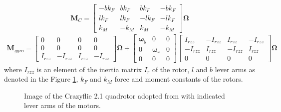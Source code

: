 \documentclass[11pt, a4paper, twoside]{report}
\begin{document}
\begin{equation}
	\bm{M}_C = 	
	\begin{bmatrix}
		-bk_F & bk_F & bk_F & -bk_F \\
		lk_F & lk_F & -lk_F & -lk_F \\
		k_M & -k_M & k_M & -k_M 
	\end{bmatrix} \bm{\Omega}
	\label{eq:m_c}
\end{equation}
\begin{equation}
	\begin{split}
	\bm{M}_{gyro} = 
	\begin{bmatrix}
		0 & 0 & 0 & 0 \\
		0 & 0 & 0 & 0 \\
		I_{rzz} & -I_{rzz} & I_{rzz} & -I_{rzz}
	\end{bmatrix} \bm{\dot{\Omega}}	+
	\begin{bmatrix}
		\bm{\omega}_y & 0 & 0 \\
		0 & \bm{\omega}_x & 0 \\
		0 & 0 & 0 
	\end{bmatrix}	
	\begin{bmatrix}
		I_{rzz} & -I_{rzz} & I_{rzz} & -I_{rzz} \\
		-I_{rzz} & I_{rzz} & -I_{rzz} & I_{rzz} \\
		0 & 0 & 0 & 0 
	\end{bmatrix} \bm{\Omega}
	\label{eq:m_gyro}
	\end{split}
\end{equation}
where $I_{rzz}$ is an element of the inertia matrix $I_{r}$ of the rotor, $l$ and $b$ lever arms as denoted in the Figure \ref{fig:frames_leverarms}, $k_F$ and $k_M$ force and moment constants of the rotors.
\begin{figure}[H]
	\centering 
	\captionsetup{justification=centering, singlelinecheck=off, font=bf, belowskip=-0.5cm}
	\caption[Crazyflie 2.1 nano-quadrotor with indicated lever arms of the motors]{Image of the Crazyflie 2.1 quadrotor adopted from \cite{bitcraze} with indicated lever arms of the motors.}
	\label{fig:frames_leverarms}
\end{figure}
\end{document}
